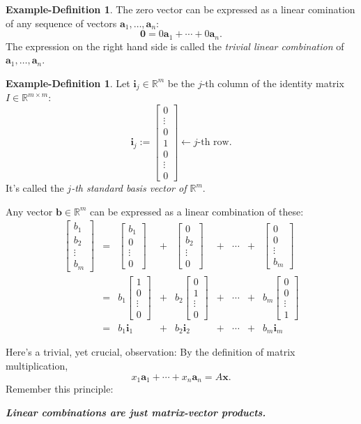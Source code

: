 \documentclass[12pt]{amsart}
\newcommand{\RR}{\mathbb{R}}
\theoremstyle{definition} \newtheorem{definition}[theorem]{Definition}
\newtheorem{exdef}[theorem]{Example-Definition}
\newcommand{\ba}{\mathbf{a}}
\newcommand{\bb}{\mathbf{b}}
\newcommand{\bi}{\mathbf{i}}
\newcommand{\bx}{\mathbf{x}}
\newcommand{\bzero}{\mathbf{0}}
\newcommand{\bas}{\ba_1,\ldots,\ba_n}
\newcommand{\mat}[1]{\begin{bmatrix}#1\end{bmatrix}}
\begin{document}
\begin{exdef}\label{exdef:trivial_lc}
  The zero vector can be expressed as a	linear comination of any sequence of vectors $\bas$:
  \[ \bzero = 0\ba_1+ \cdots + 0\ba_n.  \]
  The expression on the right hand side is called the \emph{trivial linear combination} of $\bas$.
\end{exdef}

\begin{exdef}\label{exdef:standard_basis}
  Let $\bi_j\in\RR^m$ be the $j$-th column of the identity matrix $I\in\RR^{m\times m}$:
  \[
    \bi_j := \mat{0\\\vdots\\0\\1\\0\\\vdots\\0} \leftarrow \text{$j$-th row}.
  \]
  It's called the \emph{$j$-th standard basis vector of $\RR^m$}.

  Any vector $\bb\in\RR^m$ can be expressed as a linear combination of these:
\[
  \begin{array}{rcrcrcccr}
    \mat{b_1\\b_2\\\vdots\\b_m} &=&
\mat{b_1\\0\\\vdots\\0} 
&+& \mat{0\\b_2\\\vdots\\0}
&+& \cdots
&+& \mat{0\\0\\\vdots\\b_m} \\
&=& b_1\mat{1\\0\\\vdots\\0} 
&+& b_2\mat{0\\1\\\vdots\\0}
&+& \cdots
&+& b_m\mat{0\\0\\\vdots\\1} \\
&=& b_1\bi_1 &+& b_2\bi_2 &+&  \cdots  &+& b_m\bi_m
  \end{array}
\]
\end{exdef}

Here's a trivial, yet crucial, observation: By the definition of matrix multiplication,
\begin{equation}\label{eq:lc_matvec}
  x_1\ba_1+\cdots + x_n\ba_n = A\bx. 
\end{equation}
Remember this principle:
\begin{center}
  \textbf{\textit{Linear combinations are just matrix-vector products.}}
\end{center}
\end{document}
